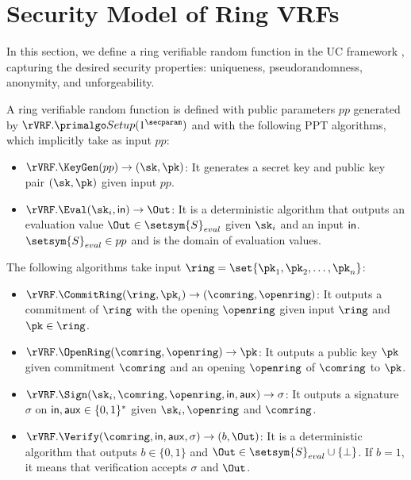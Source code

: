 
\section{Security Model  of Ring VRFs}\label{sec:functionality}

In this section, we define a ring verifiable random function in the UC framework  \cite{canetti1,canetti2}, capturing the desired security properties: uniqueness, pseudorandomness, anonymity, and unforgeability.

\begin{definition} \label{def:ringVRF}	 A ring verifiable random function is defined with public parameters $ pp $ generated by  $ \rVRF.\Setup(1^\secparam) $ and with the following  PPT algorithms, which implicitly take as input $ pp $:
	\begin{itemize}
		\item $ \rVRF.\KeyGen(pp) \rightarrow (\sk,\pk)$: It generates a secret key and public key pair $ (\sk,\pk) $ given input $ pp $.
		\item $ \rVRF.\Eval(\sk_i, \msg) \rightarrow \Out$: It is a deterministic algorithm that outputs an evaluation value $ \Out \in \setsym{S}_{eval}$ given  $ \sk_i $ and an input $ \mathsf{in} $. $ \setsym{S}_{eval} \in pp$ and is the domain  of  evaluation values.
	\end{itemize}
	The following algorithms take input $ \ring = \set{\pk_1, \pk_2, \ldots, \pk_n}$:
	\begin{itemize}
		\item $ \rVRF.\CommitRing(\ring, \pk_i)  \rightarrow (\comring, \openring)$: It  outputs a commitment of $ \ring $ with the opening $ \openring $ given input  $ \ring $ and $ \pk \in \ring $.
		\item $ \rVRF.\OpenRing(\comring,\openring) \rightarrow \pk $: It  outputs a public key $ \pk  $ given commitment $ \comring $ and an opening $ \openring $ of $\comring$ to $\pk$.
		\item $ \rVRF.\Sign(\sk_i, \comring,\openring, \msg, \aux)\rightarrow \sigma$: It  outputs a  signature  $\sigma $  on  $ \mathsf{in}, \mathsf{aux} \in \{0,1\}^*$ given $ \sk_i, \openring $  and $ \comring $.
		\item $ \rVRF.\Verify(\comring,\msg,\aux,\sigma) \rightarrow  (b, \Out)$: It is a deterministic  algorithm that outputs  $ b \in \{0,1\} $ and $ \Out \in\setsym{S}_{eval}\cup \{\perp\} $. If $ b =1 $, it means that verification accepts $ \sigma $ and $ \Out $.
	\end{itemize}
	
\end{definition}


